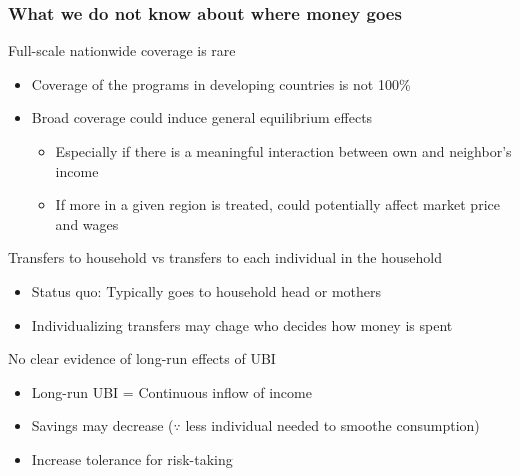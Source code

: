 \documentclass[aspectratio=169]{beamer}
\begin{document}
\begin{frame}
\frametitle{What we do not know about where money goes} 
Full-scale nationwide coverage is rare
\begin{itemize}\setlength\itemsep{3pt}
\item Coverage of the programs in developing countries is not 100\%
\item Broad coverage could induce general equilibrium effects
\begin{itemize}\setlength\itemsep{3pt}
\item Especially if there is a meaningful interaction between own and neighbor's income
\item If more in a given region is treated, could potentially affect market price and wages
\end{itemize}
\end{itemize}\medskip
Transfers to household vs transfers to each individual in the household
\begin{itemize}\setlength\itemsep{3pt}
\item Status quo: Typically goes to household head or mothers
\item Individualizing transfers may chage who decides how money is spent
\end{itemize}\medskip
No clear evidence of long-run effects of UBI
\begin{itemize}\setlength\itemsep{3pt}
\item Long-run UBI = Continuous inflow of income
  \item Savings may decrease ($\because$ less individual needed to smoothe consumption)
\item Increase tolerance for risk-taking
\end{itemize}
\end{frame}
\end{document}
